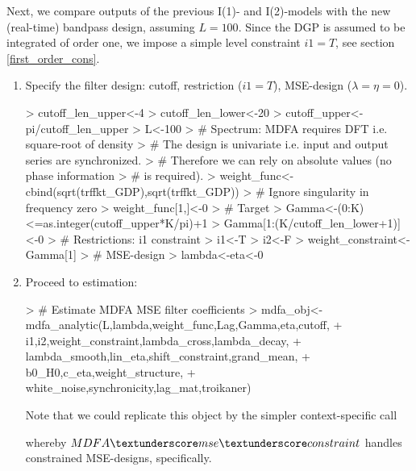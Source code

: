 \documentclass[a4paper]{book}
\begin{document}
Next, we compare outputs of the previous I(1)- and I(2)-models with the new (real-time) bandpass design, assuming $L=100$. Since the DGP is assumed to be integrated of order one, we impose a simple level constraint $i1=T$, see section \ref{first_order_cons}. 
\begin{enumerate}
\item Specify the filter design: cutoff, restriction ($i1=T$), MSE-design ($\lambda=\eta=0$).
\begin{Schunk}
\begin{Sinput}
> cutoff_len_upper<-4
> cutoff_len_lower<-20
> cutoff_upper<-pi/cutoff_len_upper
> L<-100
> # Spectrum: MDFA requires DFT i.e. square-root of density 
> # The design is univariate i.e. input and output series are synchronized.
> # Therefore we can rely on absolute values (no phase information 
> #   is required).
> weight_func<-cbind(sqrt(trffkt_GDP),sqrt(trffkt_GDP))
> # Ignore singularity in frequency zero 
> weight_func[1,]<-0
> # Target
> Gamma<-(0:K)<=as.integer(cutoff_upper*K/pi)+1
> Gamma[1:(K/cutoff_len_lower+1)]<-0
> # Restrictions: i1 constraint
> i1<-T
> i2<-F
> weight_constraint<-Gamma[1]
> # MSE-design
> lambda<-eta<-0
\end{Sinput}
\end{Schunk}
\item Proceed to estimation:
\begin{Schunk}
\begin{Sinput}
> # Estimate MDFA MSE filter coefficients  
> mdfa_obj<-mdfa_analytic(L,lambda,weight_func,Lag,Gamma,eta,cutoff,
+                   i1,i2,weight_constraint,lambda_cross,lambda_decay,
+                   lambda_smooth,lin_eta,shift_constraint,grand_mean,
+                   b0_H0,c_eta,weight_structure,
+                   white_noise,synchronicity,lag_mat,troikaner)
\end{Sinput}
\end{Schunk}
Note that we could replicate this object by the simpler context-specific call
\begin{Schunk}
\end{Schunk}
whereby $MDFA\textunderscore mse\textunderscore constraint$ handles constrained MSE-designs, specifically.


\end{enumerate}
\end{document}
